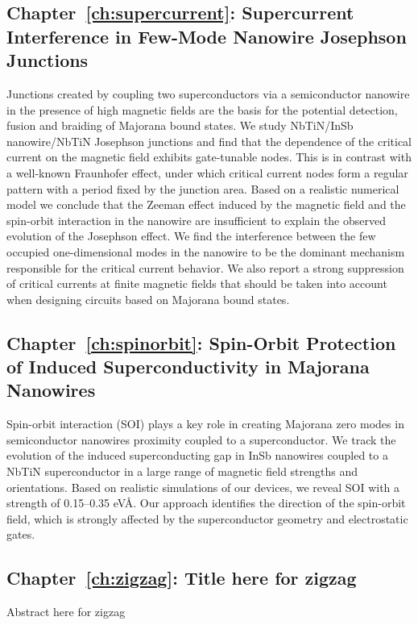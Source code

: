 \subsection{Chapter~\ref{ch:supercurrent}: Supercurrent Interference in Few-Mode Nanowire Josephson Junctions}
Junctions created by coupling two superconductors via a semiconductor nanowire in the presence of high magnetic fields are the basis for the potential detection, fusion and braiding of Majorana bound states.
We study NbTiN/InSb nanowire/NbTiN Josephson junctions and find that the dependence of the critical current on the magnetic field exhibits gate-tunable nodes.
This is in contrast with a well-known Fraunhofer effect, under which critical current nodes form a regular pattern with a period fixed by the junction area.
Based on a realistic numerical model we conclude that the Zeeman effect induced by the magnetic field and the spin-orbit interaction in the nanowire are insufficient to explain the observed evolution of the Josephson effect.
We find the interference between the few occupied one-dimensional modes in the nanowire to be the dominant mechanism responsible for the critical current behavior.
We also report a strong  suppression of critical currents at finite magnetic fields that should be taken into account when designing circuits based on Majorana bound states.
\vspace{1mm}

\subsection{Chapter~\ref{ch:spinorbit}: Spin-Orbit Protection of Induced Superconductivity in Majorana Nanowires}
Spin-orbit interaction (SOI) plays a key role in creating Majorana zero modes in semiconductor nanowires proximity coupled to a superconductor.
We track the evolution of the induced superconducting gap in InSb nanowires coupled to a NbTiN superconductor in a large range of magnetic field strengths and orientations.
Based on realistic simulations of our devices, we reveal SOI with a strength of 0.15--0.35 eV\AA.
Our approach identifies the direction of the spin-orbit field, which is strongly affected by the superconductor geometry and electrostatic gates.
\vspace{1mm}

\subsection{Chapter~\ref{ch:zigzag}: Title here for zigzag}
Abstract here for zigzag
\vspace{1mm}

